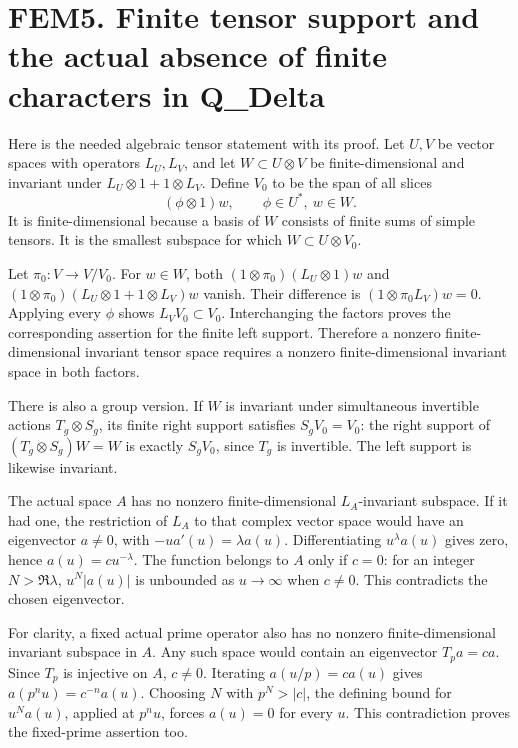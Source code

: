 \section{FEM5. Finite tensor support and the actual absence of finite
characters in
Q\_Delta}\label{fem5.-finite-tensor-support-and-the-actual-absence-of-finite-characters-in-q_delta}

Here is the needed algebraic tensor statement with its proof. Let
\(U,V\) be vector spaces with operators \(L_U,L_V\), and let
\(W\subset U\otimes V\) be finite-dimensional and invariant under
\(L_U\otimes1+1\otimes L_V\). Define \(V_0\) to be the span of all
slices \[
(\phi\otimes1)w,\qquad \phi\in U^*,\ w\in W .
\] It is finite-dimensional because a basis of \(W\) consists of finite
sums of simple tensors. It is the smallest subspace for which
\(W\subset U\otimes V_0\).

Let \(\pi_0:V\to V/V_0\). For \(w\in W\), both
\((1\otimes\pi_0)(L_U\otimes1)w\) and
\((1\otimes\pi_0)(L_U\otimes1+1\otimes L_V)w\) vanish. Their difference
is \((1\otimes\pi_0L_V)w=0\). Applying every \(\phi\) shows
\(L_VV_0\subset V_0\). Interchanging the factors proves the
corresponding assertion for the finite left support. Therefore a nonzero
finite-dimensional invariant tensor space requires a nonzero
finite-dimensional invariant space in both factors.

There is also a group version. If \(W\) is invariant under simultaneous
invertible actions \(T_g\otimes S_g\), its finite right support
satisfies \(S_gV_0=V_0\): the right support of \((T_g\otimes S_g)W=W\)
is exactly \(S_gV_0\), since \(T_g\) is invertible. The left support is
likewise invariant.

The actual space \(A\) has no nonzero finite-dimensional
\(L_A\)-invariant subspace. If it had one, the restriction of \(L_A\) to
that complex vector space would have an eigenvector \(a\ne0\), with
\(-ua'(u)=\lambda a(u)\). Differentiating \(u^\lambda a(u)\) gives zero,
hence \(a(u)=c u^{-\lambda}\). The function belongs to \(A\) only if
\(c=0\): for an integer \(N>\Re\lambda\), \(u^N|a(u)|\) is unbounded as
\(u\to\infty\) when \(c\ne0\). This contradicts the chosen eigenvector.

For clarity, a fixed actual prime operator also has no nonzero
finite-dimensional invariant subspace in \(A\). Any such space would
contain an eigenvector \(T_pa=c a\). Since \(T_p\) is injective on
\(A\), \(c\ne0\). Iterating \(a(u/p)=c a(u)\) gives
\(a(p^nu)=c^{-n}a(u)\). Choosing \(N\) with \(p^N>|c|\), the defining
bound for \(u^Na(u)\), applied at \(p^nu\), forces \(a(u)=0\) for every
\(u\). This contradiction proves the fixed-prime assertion too.

